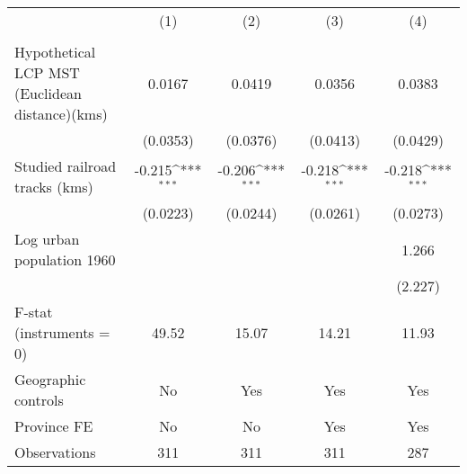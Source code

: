 {
\def\sym#1{\ifmmode^{#1}\else\(^{#1}\)\fi}
\begin{tabular}{l*{4}{c}}
\hline\hline
                &\multicolumn{1}{c}{(1)}&\multicolumn{1}{c}{(2)}&\multicolumn{1}{c}{(3)}&\multicolumn{1}{c}{(4)}\\
                &\multicolumn{1}{c}{}&\multicolumn{1}{c}{}&\multicolumn{1}{c}{}&\multicolumn{1}{c}{}\\
\hline
Hypothetical LCP MST (Euclidean distance)(kms)&   0.0167         &   0.0419         &   0.0356         &   0.0383         \\
                & (0.0353)         & (0.0376)         & (0.0413)         & (0.0429)         \\
[1em]
Studied railroad tracks (kms)&   -0.215\sym{***}&   -0.206\sym{***}&   -0.218\sym{***}&   -0.218\sym{***}\\
                & (0.0223)         & (0.0244)         & (0.0261)         & (0.0273)         \\
[1em]
Log urban population 1960&                  &                  &                  &    1.266         \\
                &                  &                  &                  &  (2.227)         \\
\hline
F-stat (instruments = 0)&    49.52         &    15.07         &    14.21         &    11.93         \\
Geographic controls&       No         &      Yes         &      Yes         &      Yes         \\
Province FE     &       No         &       No         &      Yes         &      Yes         \\
Observations    &      311         &      311         &      311         &      287         \\
\hline\hline
\end{tabular}
}

